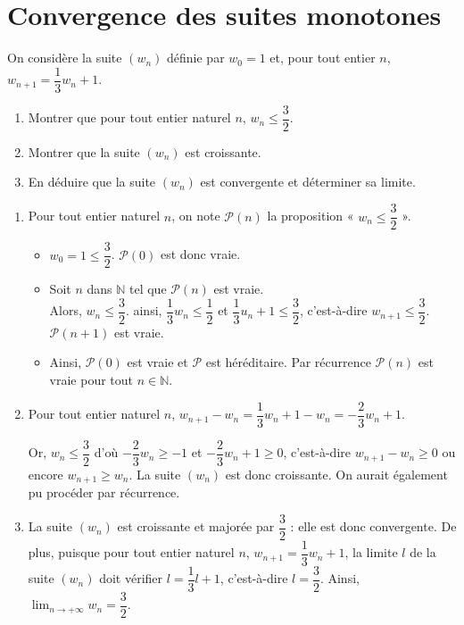 \documentclass[11pt,fleqn, openany]{book} %
\begin{document}


\section*{Convergence des suites monotones}

\begin{exercise}[topic=lim13] On considère la suite $(w_n)$ définie par $w_0=1$ et, pour tout entier $n$, $w_{n+1}=\dfrac{1}{3}w_n+1$. 
\begin{enumerate}
\item Montrer que pour tout entier naturel $n$, $w_n\leqslant \dfrac{3}{2}$.
\item Montrer que la suite $(w_n)$ est croissante.
\item En déduire que la suite $(w_n)$ est convergente et déterminer sa limite.
\end{enumerate}\end{exercise}

\begin{solution}\hspace{0pt}
\begin{enumerate}
\item Pour tout entier naturel $n$, on note $\mathcal{P}(n)$ la proposition « $w_n\leqslant \dfrac{3}{2}$ ».

\begin{itemize}
\item $w_0= 1\leqslant \dfrac{3}{2}$. $\mathcal{P}(0)$ est donc vraie.
\item Soit $n$ dans $\mathbb{N}$ tel que $\mathcal{P}(n)$ est vraie. \\
Alors, $w_n \leqslant \dfrac{3}{2}$. ainsi, $\dfrac{1}{3}w_n \leqslant \dfrac{1}{2}$ et $\dfrac{1}{3}u_n+1\leqslant \dfrac{3}{2}$, c'est-à-dire $w_{n+1} \leqslant \dfrac{3}{2}$. $\mathcal{P}(n+1)$ est vraie.
\item Ainsi, $\mathcal{P}(0)$ est vraie et $\mathcal{P}$ est héréditaire. Par récurrence $\mathcal{P}(n)$ est vraie pour tout $n\in\mathbb{N}$.
\end{itemize}

\item Pour tout entier naturel $n$, $w_{n+1}-w_n=\dfrac{1}{3}w_n+1-w_n=-\dfrac{2}{3}w_n+1$.

Or, $w_n \leqslant \dfrac{3}{2}$ d'où $-\dfrac{2}{3}w_n \geqslant -1$ et $-\dfrac{2}{3}w_n+1 \geqslant 0$, c'est-à-dire $w_{n+1}-w_n \geqslant 0$ ou encore $w_{n+1} \geqslant w_n$. La suite $(w_n)$ est donc croissante. On aurait également pu procéder par récurrence.

\item La suite $(w_n)$ est croissante et majorée par $\dfrac{3}{2}$ : elle est donc convergente. De plus, puisque pour tout entier naturel $n$, $w_{n+1}=\dfrac{1}{3}w_n +1$, la limite $l$ de la suite $(w_n)$ doit vérifier $l=\dfrac{1}{3}l+1$, c'est-à-dire $l=\dfrac{3}{2}$. Ainsi, $\displaystyle \lim_{n\to +\infty} w_n=\dfrac{3}{2}$.\end{enumerate}\end{solution}
\end{document}
